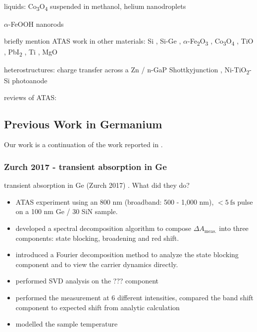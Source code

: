 liquids: Co\textsubscript{3}O\textsubscript{4} suspended in methanol, helium nanodroplets \cite{ziemkiewiczFemtosecondTimeresolvedXUV2014}

$\alpha$-FeOOH nanorods \cite{porterPhotoexcitedSmallPolaron2018}

briefly mention ATAS work in other materials: Si \cite{schultzeAttosecondBandgapDynamics2014,cushingDifferentiatingPhotoexcitedCarrier2019}, Si-Ge \cite{zurchUltrafastCarrierThermalization2017}, $\alpha$-Fe\textsubscript{2}O\textsubscript{3} \cite{vura-weisFemtosecondEdgeSpectroscopy2013}, Co\textsubscript{3}O\textsubscript{4} \cite{jiangCharacterizationPhotoInducedCharge2014}, TiO \cite{vaidaFemtosecondExtremeUltraviolet2016}, PbI\textsubscript{2} \cite{linCarrierSpecificFemtosecondXUV2017}, Ti \cite{volkovAttosecondScreeningDynamics2019}, MgO \cite{geneauxAttosecondTimeDomainMeasurement2020}

heterostructures: charge transfer across a Zn / n-GaP Shottkyjunction \cite{marshUltrafastTimeresolvedExtreme2018}, Ni-TiO\textsubscript{2}-Si photoanode \cite{cushingLayerresolvedUltrafastExtreme2020}

reviews of ATAS: \cite{beckProbingUltrafastDynamics2015,leoneWhatWillIt2014,changAttosecondOpticsTechnology2016,ramaseshaRealTimeProbingElectron2016,geneauxTransientAbsorptionSpectroscopy2019}

\subsection{Previous Work in Germanium}

Our work is a continuation of the work reported in \cite{zurchDirectSimultaneousObservation2017}.

\subsubsection{Zurch 2017 - transient absorption in Ge}
transient absorption in Ge (Zurch 2017) \cite{zurchDirectSimultaneousObservation2017}. What did they do?

\begin{itemize}
	\item ATAS experiment using an 800 nm (broadband: 500 - 1,000 nm), $<5 \ \textrm{fs}$ pulse on a 100 nm Ge / 30 SiN sample.
	\item developed a spectral decomposition algorithm to compose $\Delta A_{\textrm{meas.}}$ into three components: state blocking, broadening and red shift.
	\item introduced a Fourier decomposition method to analyze the state blocking component and to view the carrier dynamics directly.
	\item performed SVD analysis on the ??? component
	\item performed the measurement at 6 different intensities, compared the band shift component to expected shift from analytic calculation
	\item modelled the sample temperature
\end{itemize}

